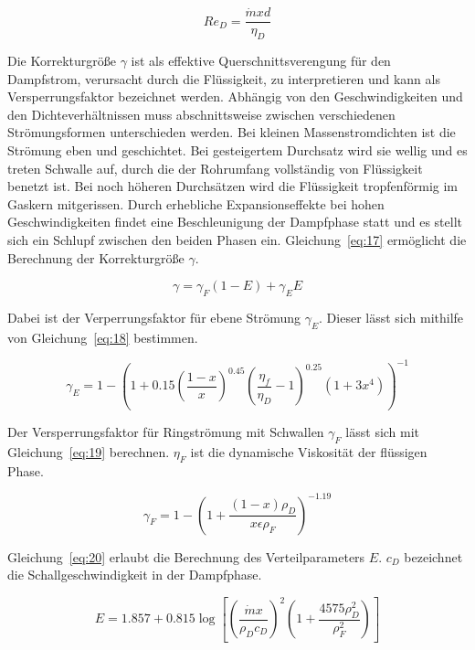 \begin{equation}
\label{eq:16}
Re_D = \frac{\dot{m} x d}{\eta_D}
\end{equation}

Die Korrekturgröße $\gamma$ ist als effektive Querschnittsverengung für den Dampfstrom, verursacht durch die Flüssigkeit, zu interpretieren und kann als Versperrungsfaktor bezeichnet werden. Abhängig von den Geschwindigkeiten und den Dichteverhältnissen muss abschnittsweise zwischen verschiedenen Strömungsformen unterschieden werden. Bei kleinen Massenstromdichten ist die Strömung eben und geschichtet. Bei gesteigertem Durchsatz wird sie wellig und es treten Schwalle auf, durch die der Rohrumfang vollständig von Flüssigkeit benetzt ist. Bei noch höheren Durchsätzen wird die Flüssigkeit tropfenförmig im Gaskern mitgerissen. Durch erhebliche Expansionseffekte bei hohen Geschwindigkeiten findet eine Beschleunigung der Dampfphase statt und es stellt sich ein Schlupf zwischen den beiden Phasen ein\cite{Kesper.1976}.
Gleichung~\ref{eq:17} ermöglicht die Berechnung der Korrekturgröße $\gamma$.

\begin{equation}
\label{eq:17}
\gamma = \gamma_F(1-E) + \gamma_E E
\end{equation}

Dabei ist der Verperrungsfaktor für ebene Strömung $\gamma_E$. Dieser lässt sich mithilfe von Gleichung~\ref{eq:18} bestimmen.

\begin{equation}
\label{eq:18}
\gamma_E = 1 - \left( 1+0.15 \left( \frac{1-x}{x} \right)^{0.45} \left( \frac{\eta_f}{\eta_D}-1 \right)^{0.25} (1 + 3x^4)\right)^{-1}
\end{equation}

Der Versperrungsfaktor für Ringströmung mit Schwallen $\gamma_F$ lässt sich mit Gleichung~\ref{eq:19} berechnen. $\eta_F$ ist die dynamische Viskosität der flüssigen Phase.

\begin{equation}
\label{eq:19}
\gamma_F = 1 - \left(1+\frac{(1-x)\rho_D}{x \epsilon \rho_F}\right)^{-1.19}
\end{equation}


Gleichung~\ref{eq:20} erlaubt die Berechnung des Verteilparameters $E$. $c_D$ bezeichnet die Schallgeschwindigkeit in der Dampfphase.

\begin{equation}
\label{eq:20}
E = 1.857 + 0.815 \log\left[\left(\frac{\dot{m} x}{\rho_D c_D}\right)^2 \left( 1+ \frac{4575 \rho_D^2}{\rho_F^2} \right)\right]
\end{equation}

